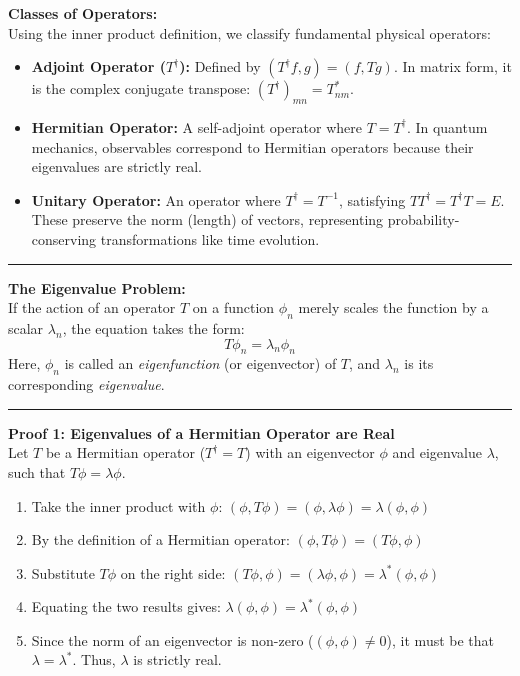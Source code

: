 \documentclass[11pt, a4paper]{report}
\begin{document}
\textbf{Classes of Operators:}\\
Using the inner product definition, we classify fundamental physical operators:
\begin{itemize}
    \item \textbf{Adjoint Operator ($T^\dagger$):} Defined by $(T^\dagger f, g) = (f, T g)$. In matrix form, it is the complex conjugate transpose: $(T^\dagger)_{mn} = T_{nm}^*$.
    \item \textbf{Hermitian Operator:} A self-adjoint operator where $T = T^\dagger$. In quantum mechanics, observables correspond to Hermitian operators because their eigenvalues are strictly real.
    \item \textbf{Unitary Operator:} An operator where $T^\dagger = T^{-1}$, satisfying $T T^\dagger = T^\dagger T = E$. These preserve the norm (length) of vectors, representing probability-conserving transformations like time evolution.
\end{itemize}

\vspace{1em}
\hrule
\vspace{1em}

\textbf{The Eigenvalue Problem:}\\
If the action of an operator $T$ on a function $\phi_n$ merely scales the function by a scalar $\lambda_n$, the equation takes the form:
\[ T \phi_n = \lambda_n \phi_n \]
Here, $\phi_n$ is called an \textit{eigenfunction} (or eigenvector) of $T$, and $\lambda_n$ is its corresponding \textit{eigenvalue}.

\vspace{1em}
\hrule
\vspace{1em}

\textbf{Proof 1: Eigenvalues of a Hermitian Operator are Real}\\
Let $T$ be a Hermitian operator ($T^\dagger = T$) with an eigenvector $\phi$ and eigenvalue $\lambda$, such that $T\phi = \lambda\phi$.
\begin{enumerate}
    \item Take the inner product with $\phi$: $(\phi, T\phi) = (\phi, \lambda\phi) = \lambda(\phi, \phi)$
    \item By the definition of a Hermitian operator: $(\phi, T\phi) = (T\phi, \phi)$
    \item Substitute $T\phi$ on the right side: $(T\phi, \phi) = (\lambda\phi, \phi) = \lambda^*(\phi, \phi)$
    \item Equating the two results gives: $\lambda(\phi, \phi) = \lambda^*(\phi, \phi)$
    \item Since the norm of an eigenvector is non-zero ($(\phi, \phi) \neq 0$), it must be that $\lambda = \lambda^*$. Thus, $\lambda$ is strictly real.
\end{enumerate}
\end{document}
